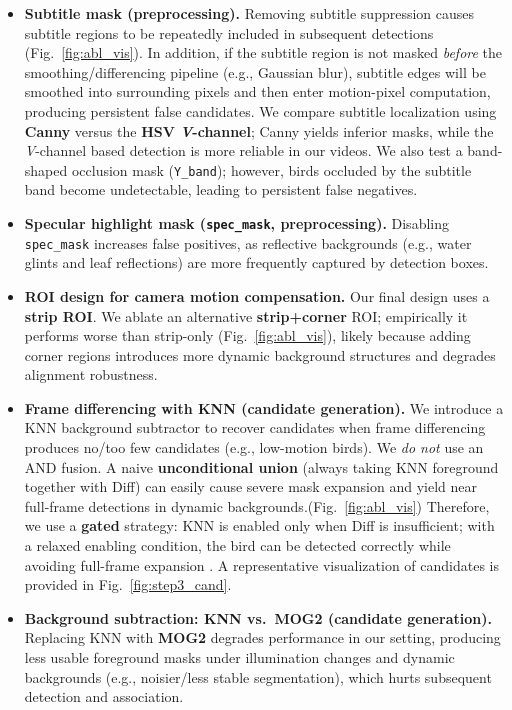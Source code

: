 \begin{itemize}
    \item \textbf{Subtitle mask (preprocessing).}
    Removing subtitle suppression causes subtitle regions to be repeatedly included in subsequent detections (Fig.~\ref{fig:abl_vis}).
    In addition, if the subtitle region is not masked \emph{before} the smoothing/differencing pipeline (e.g., Gaussian blur), subtitle edges will be smoothed into surrounding pixels and then enter motion-pixel computation, producing persistent false candidates.
    We compare subtitle localization using \textbf{Canny} versus the \textbf{HSV \emph{V}-channel}; Canny yields inferior masks, while the \emph{V}-channel based detection is more reliable in our videos.
    We also test a band-shaped occlusion mask (\texttt{Y\_band}); however, birds occluded by the subtitle band become undetectable, leading to persistent false negatives.

    \item \textbf{Specular highlight mask (\texttt{spec\_mask}, preprocessing).}
    Disabling \texttt{spec\_mask} increases false positives, as reflective backgrounds (e.g., water glints and leaf reflections) are more frequently captured by detection boxes.

    \item \textbf{ROI design for camera motion compensation.}
    Our final design uses a \textbf{strip ROI}. We ablate an alternative \textbf{strip+corner} ROI; empirically it performs worse than strip-only (Fig.~\ref{fig:abl_vis}), likely because adding corner regions introduces more dynamic background structures and degrades alignment robustness.

    \item \textbf{Frame differencing with KNN (candidate generation).}
    We introduce a KNN background subtractor to recover candidates when frame differencing produces no/too few candidates (e.g., low-motion birds). We \emph{do not} use an AND fusion. A naive \textbf{unconditional union} (always taking KNN foreground together with Diff) can easily cause severe mask expansion and yield near full-frame detections in dynamic backgrounds.(Fig.~\ref{fig:abl_vis})
    Therefore, we use a \textbf{gated} strategy: KNN is enabled only when Diff is insufficient; with a relaxed enabling condition, the bird can be detected correctly while avoiding full-frame expansion .
    A representative visualization of candidates is provided in Fig.~\ref{fig:step3_cand}.

    \item \textbf{Background subtraction: KNN vs.\ MOG2 (candidate generation).}
    Replacing KNN with \textbf{MOG2} degrades performance in our setting, producing less usable foreground masks under illumination changes and dynamic backgrounds (e.g., noisier/less stable segmentation), which hurts subsequent detection and association.
\end{itemize}